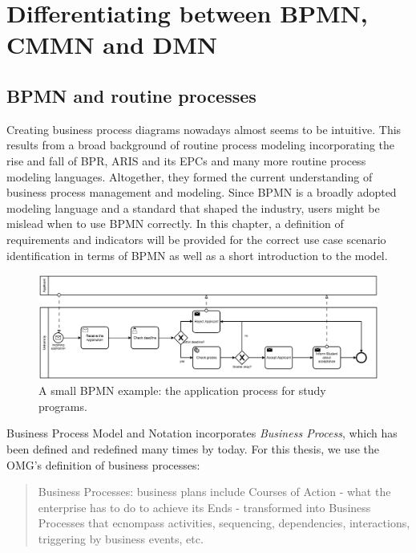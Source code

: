 

\chapter{Differentiating between BPMN, CMMN and DMN}
\label{chapter:indicators}


\section{BPMN and routine processes}
\label{section:BPMNindicators}
Creating business process diagrams nowadays almost seems to be intuitive. This results from a broad background of routine process modeling incorporating the rise and fall of BPR, ARIS and its EPCs and many more routine process modeling languages. Altogether, they formed the current understanding of business process management and modeling. 
Since BPMN is a broadly adopted modeling language and a standard that shaped the industry, users might be mislead when to use BPMN correctly. In this chapter, a definition of requirements and indicators will be provided for the correct use case scenario identification in terms of BPMN as well as a short introduction to the model. 

\begin{figure}

	\centering
	\includegraphics[scale=0.5]{../figures/chapter_indicators/BPMN_Example_Student_Application.png} 
		\caption{A small BPMN example: the application process for study programs.}
	\label{fig:BPMNex}
\end{figure}

Business Process Model and Notation incorporates \textit{Business Process}, which has been defined and redefined many times by today. For this thesis, we use the OMG's definition of business processes: 
\begin{quote}
Business Processes: business plans include Courses of Action - what the enterprise has to do to achieve its Ends - transformed into Business Processes that ecnompass activities, sequencing, dependencies, interactions, triggering by business events, etc. \cite{bmm2015}
\end{quote}

